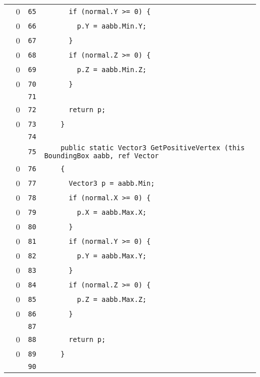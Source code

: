 \documentclass[a4paper,10pt]{article}
\begin{document}
\begin{longtable}[l]{lrrl}
\cellcolor{red} & 0 & \verb~65~ & \verb~      if (normal.Y >= 0) {~\\
\cellcolor{red} & 0 & \verb~66~ & \verb~        p.Y = aabb.Min.Y;~\\
\cellcolor{red} & 0 & \verb~67~ & \verb~      }~\\
\cellcolor{red} & 0 & \verb~68~ & \verb~      if (normal.Z >= 0) {~\\
\cellcolor{red} & 0 & \verb~69~ & \verb~        p.Z = aabb.Min.Z;~\\
\cellcolor{red} & 0 & \verb~70~ & \verb~      }~\\
\cellcolor{gray} &  & \verb~71~ & \verb~~\\
\cellcolor{red} & 0 & \verb~72~ & \verb~      return p;~\\
\cellcolor{red} & 0 & \verb~73~ & \verb~    }~\\
\cellcolor{gray} &  & \verb~74~ & \verb~~\\
\cellcolor{gray} &  & \verb~75~ & \verb~    public static Vector3 GetPositiveVertex (this BoundingBox aabb, ref Vector~\\
\cellcolor{red} & 0 & \verb~76~ & \verb~    {~\\
\cellcolor{red} & 0 & \verb~77~ & \verb~      Vector3 p = aabb.Min;~\\
\cellcolor{red} & 0 & \verb~78~ & \verb~      if (normal.X >= 0) {~\\
\cellcolor{red} & 0 & \verb~79~ & \verb~        p.X = aabb.Max.X;~\\
\cellcolor{red} & 0 & \verb~80~ & \verb~      }~\\
\cellcolor{red} & 0 & \verb~81~ & \verb~      if (normal.Y >= 0) {~\\
\cellcolor{red} & 0 & \verb~82~ & \verb~        p.Y = aabb.Max.Y;~\\
\cellcolor{red} & 0 & \verb~83~ & \verb~      }~\\
\cellcolor{red} & 0 & \verb~84~ & \verb~      if (normal.Z >= 0) {~\\
\cellcolor{red} & 0 & \verb~85~ & \verb~        p.Z = aabb.Max.Z;~\\
\cellcolor{red} & 0 & \verb~86~ & \verb~      }~\\
\cellcolor{gray} &  & \verb~87~ & \verb~~\\
\cellcolor{red} & 0 & \verb~88~ & \verb~      return p;~\\
\cellcolor{red} & 0 & \verb~89~ & \verb~    }~\\
\cellcolor{gray} &  & \verb~90~ & \verb~~\\

\end{longtable}
\end{document}
